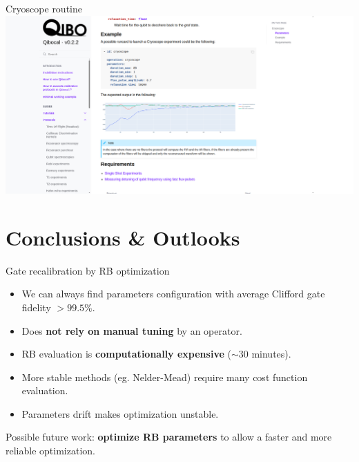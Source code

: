 \documentclass[aspectratio=169,10pt]{beamer}
\begin{document}
\begin{frame}{Cryoscope routine}
  \centering
  \includegraphics[height=\textheight]{figures/cryoscope_routine.png}
\end{frame}


\section{Conclusions \& Outlooks}

\begin{frame}{Gate recalibration by RB optimization}
  \begin{itemize}
    \item[\ding{51}] We can always find parameters configuration with average Clifford gate fidelity $> 99.5\%$.
    \item[\ding{51}] Does \textbf{not rely on manual tuning} by an operator.
    \item[\ding{55}] RB evaluation is \textbf{computationally expensive} ($\sim 30$ minutes).
    \item[\ding{55}] More stable methods (eg. Nelder-Mead) require many cost function evaluation.
    \item[\ding{55}] Parameters drift makes optimization unstable.
  \end{itemize}
  Possible future work: \textbf{optimize RB parameters} to allow a faster and more reliable optimization.
\end{frame}
\end{document}
